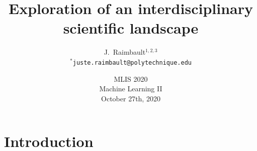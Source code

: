 



\title
[Exploration of an interdisciplinary scientific landscape]{Exploration of an interdisciplinary scientific landscape}
\author[Raimbault]{J.~Raimbault$^{1,2,3}$\\\medskip
$^{\ast}$\texttt{juste.raimbault@polytechnique.edu}
}





\date[27/10/2020]{MLIS 2020\\
Machine Learning II\\
October 27th, 2020
}

\frame{\maketitle}



\section{Introduction}


